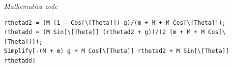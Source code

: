 \documentclass[12pt]{article}
\begin{document}
\begin{problem}{2}
\begin{solution}
\begin{center}
    \textit{Mathematica code}  
\end{center}
\begin{lstlisting}[startnumber=1]
rthetad2 = (M (1 - Cos[\[Theta]]) g)/(m + M + M Cos[\[Theta]]);
rthetadd = (M Sin[\[Theta]] (rthetad2 + g))/(2 (m + M + M Cos[\[Theta]]));
Simplify[-(M + m) g + M Cos[\[Theta]] rthetad2 + M Sin[\[Theta]] rthetadd] 
\end{lstlisting}
\end{solution}
\end{problem}
\end{document}

